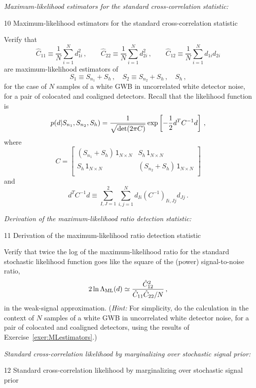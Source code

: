 \documentclass[11pt]{article}
\def\be{\begin{equation}}
\def\ee{\end{equation}}
\def\i{\item{}}
\newcommand{\unit}{\mathsf{1}}
\begin{document}
\i {\em Maximum-likelihood estimators for the standard 
cross-correlation statistic:}
{10 Maximum-likelihood estimators for the standard 
cross-correlation statistic}

\label{exer:MLestimators} 
Verify that 
%
\be
\hat C_{11}\equiv \frac{1}{N}\sum_{i=1}^N d_{1i}^2\,,
\qquad
\hat C_{22}\equiv \frac{1}{N}\sum_{i=1}^N d_{2i}^2\,,
\qquad
\hat C_{12}\equiv \frac{1}{N}\sum_{i=1}^N d_{1i} d_{2i}
\ee
%
are maximum-likelihood estimators of 
%
\be
S_1\equiv S_{n_1}+S_h\,,
\quad
S_2\equiv S_{n_2}+S_h\,,
\quad
S_h\,,
\ee
for the case of $N$ samples of a white GWB in uncorrelated
white detector noise, for a pair of colocated and coaligned 
detectors.
Recall that the likelihood function is
%
\be
p(d|S_{n_1}, S_{n_2}, S_h) =\frac{1}{\sqrt{{\rm det}(2\pi C)}}
\exp\left[-\frac{1}{2}d^T C^{-1} d\right]\,,
\ee
%
where
\be
C
= \left[
\begin{array}{cc}
(S_{n_1} +S_h)\,\unit_{N\times N} & S_h\,\unit_{N\times N}
\\
S_h\,\unit_{N\times N} & (S_{n_2} +S_h)\,\unit_{N\times N}
\\
\end{array}
\right]
\label{e:C_marginalized}
\ee
%
and 
%
\be
d^T C^{-1} d
\equiv \sum_{I,J=1}^2\sum_{i,j=1}^N
d_{Ii} \left(C^{-1}\right)_{Ii,Jj} d_{Jj}\,.
\label{e:argexp}
\ee

\i {\em Derivation of the maximum-likelihood ratio detection statistic:}
{11 Derivation of the maximum-likelihood ratio detection statistic}

Verify that twice the log of the maximum-likelihood
ratio for the standard stochastic likelihood function
goes like the square of the (power) signal-to-noise ratio,
\be
2\ln \Lambda_{\rm ML}(d) \simeq
\frac{\hat C_{12}^2}{\hat C_{11}\hat C_{22}/N}\,,
\ee
in the weak-signal approximation.
({\em Hint:} For simplicity, do the calculation in the context 
of $N$ samples of a white GWB in uncorrelated 
white detector noise, for a pair of colocated and coaligned
detectors, using the results of Exercise~\ref{exer:MLestimators}.)

\i {\em Standard cross-correlation likelihood by marginalizing over 
stochastic signal prior:}
{12 Standard cross-correlation likelihood by marginalizing over 
stochastic signal prior}
\end{document}
